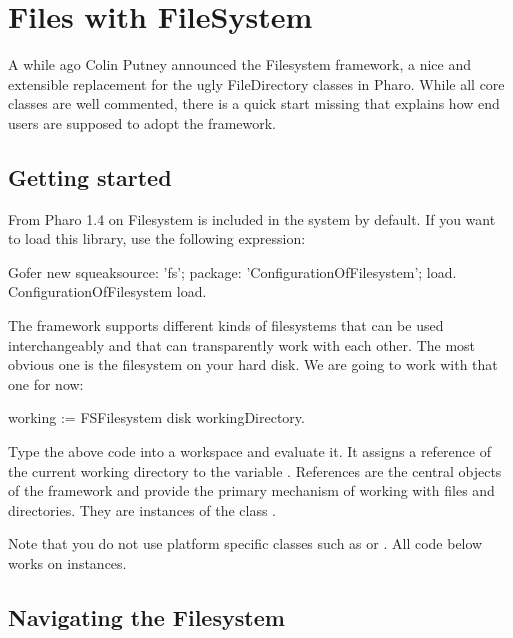 \documentclass[a4paper,10pt,twoside]{book}
\begin{document}
\fi
\sloppy
\chapter{Files with FileSystem }
\chapterauthor{\authorsteph{}}

A while ago Colin Putney announced the Filesystem framework, a nice and extensible replacement for the ugly FileDirectory classes in Pharo. While all core classes are well commented, there is a quick start missing that explains how end users are supposed to adopt the framework. 

\section{Getting started}
From Pharo 1.4 on Filesystem is included in the system by default. If you want to load this library, use the following expression:

\begin{code}{}
Gofer new
  squeaksource: 'fs'; 
  package: 'ConfigurationOfFilesystem';
  load.
ConfigurationOfFilesystem load.
\end{code}     

The framework supports different kinds of filesystems that can be used interchangeably and that can transparently work with each other. The most obvious one is the filesystem on your hard disk. We are going to work with that one for now:

\begin{code}{}
working := FSFilesystem disk workingDirectory.
\end{code} 

Type the above code into a workspace and evaluate it. It assigns a reference of the current working directory to the variable . References are the central objects of the framework and provide the primary mechanism of working with files and directories. They are instances of the class .

Note that you do not use platform specific classes such as  or . All code below works on  instances.


\section{Navigating the Filesystem}
\end{document}
